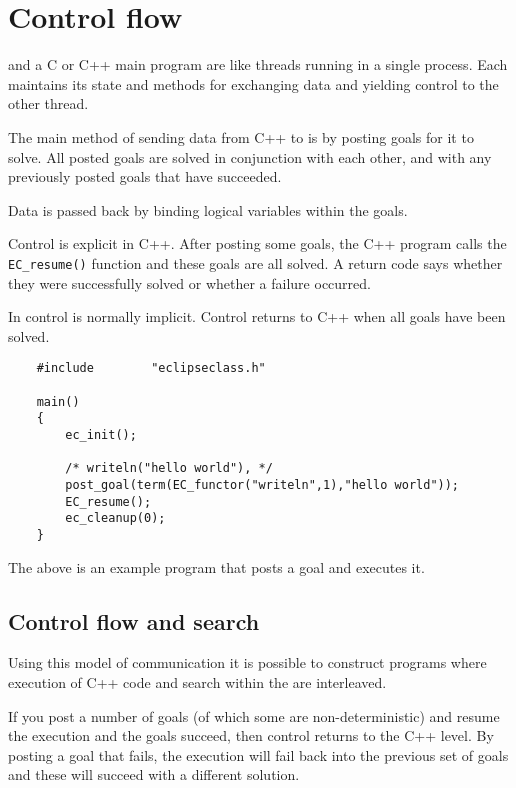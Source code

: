\section{Control flow}

{\eclipse} and a C or C++ main program are like threads running in a
single process. Each maintains its state and methods for exchanging
data and yielding control to the other thread.

The main method of sending data from C++ to {\eclipse} is by posting
goals for it to solve. All posted goals are solved in conjunction
with each other, and with any previously posted goals that have
succeeded.

Data is passed back by binding logical variables within the goals.

Control is explicit in C++. After posting some goals, the C++ program
calls the \verb.EC_resume(). function and these goals are all
solved. A return code says whether they were successfully solved
or whether a failure occurred.


In {\eclipse} control is normally implicit. Control returns to C++ when all
goals have been solved.

\begin{verbatim}
    #include        "eclipseclass.h"

    main()
    {
        ec_init();

        /* writeln("hello world"), */
        post_goal(term(EC_functor("writeln",1),"hello world"));
        EC_resume();
        ec_cleanup(0);
    }
\end{verbatim}
The above is an example program that posts a goal and executes it.

\subsection{Control flow and search}

Using this model of communication it is possible to construct programs where
execution of C++ code and search within the {\eclipse} are interleaved.

If you post a number of goals (of which some are non-deterministic) and
resume the {\eclipse} execution and the goals succeed, then control returns
to the C++ level. By posting a goal that fails, the {\eclipse} execution
will fail back into the previous set of goals and these will succeed with
a different solution. 

